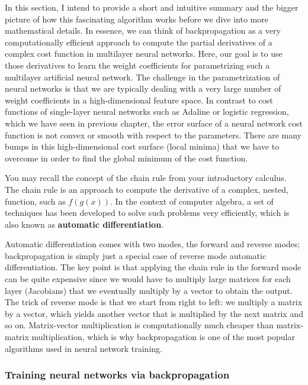 \documentclass[11pt]{article}
\begin{document}
In this section, I intend to provide a short and intuitive summary and
the bigger picture of how this fascinating algorithm works before we
dive into more mathematical details. In essence, we can think of
backpropagation as a very computationally efficient approach to compute
the partial derivatives of a complex cost function in multilayer neural
networks. Here, our goal is to use those derivatives to learn the weight
coefficients for parametrizing such a multilayer artificial neural
network. The challenge in the parametrization of neural networks is that
we are typically dealing with a very large number of weight coefficients
in a high-dimensional feature space. In contrast to cost functions of
single-layer neural networks such as Adaline or logistic regression,
which we have seen in previous chapter, the error surface of a neural
network cost function is not convex or smooth with respect to the
parameters. There are many bumps in this high-dimensional cost surface
(local minima) that we have to overcome in order to find the global
minimum of the cost function.

You may recall the concept of the chain rule from your introductory
calculus. The chain rule is an approach to compute the derivative of a
complex, nested, function, such as \(f(g(x))\). In the context of
computer algebra, a set of techniques has been developed to solve such
problems very efficiently, which is also known as \textbf{automatic
differentiation}.

Automatic differentiation comes with two modes, the forward and reverse
modes; backpropagation is simply just a special case of reverse mode
automatic differentiation. The key point is that applying the chain rule
in the forward mode can be quite expensive since we would have to
multiply large matrices for each layer (Jacobians) that we eventually
multiply by a vector to obtain the output. The trick of reverse mode is
that we start from right to left: we multiply a matrix by a vector,
which yields another vector that is multiplied by the next matrix and so
on. Matrix-vector multiplication is computationally much cheaper than
matrix-matrix multiplication, which is why backpropagation is one of the
most popular algorithms used in neural network training.

    \subsubsection{Training neural networks via
backpropagation}\label{training-neural-networks-via-backpropagation}
\end{document}
